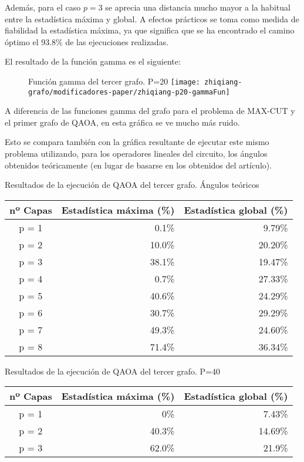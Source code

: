 Además, para el caso \(p = 3\) se aprecia una distancia mucho mayor a la habitual entre la estadística máxima y global. A efectos prácticos se toma como medida de fiabilidad la estadística máxima, ya que significa que se ha encontrado el camino óptimo el 93.8\% de las ejecuciones realizadas.

El resultado de la función gamma es el siguiente:
\begin{figure}[htbp]{}{Función gamma del tercer grafo. P=20}
  \centering
  \texttt{[image: zhiqiang-grafo/modificadores-paper/zhiqiang-p20-gammaFun]}
\end{figure}
A diferencia de las funciones gamma del grafo para el problema de MAX-CUT y el primer grafo de QAOA, en esta gráfica se ve mucho más ruido.

Esto se compara también con la gráfica resultante de ejecutar este mismo problema utilizando, para los operadores lineales del circuito, los ángulos obtenidos teóricamente (en lugar de basarse en los obtenidos del artículo).

\begin{table}[htbp]{}{Resultados de la ejecución de QAOA del tercer grafo. Ángulos teóricos}
  \centering
  \begin{tabular}{|c|r|r|}
    \hline
    \textbf{nº Capas} & \textbf{Estadística máxima (\%)} & \textbf{Estadística global (\%)} \\ \hline
    p = 1 &  0.1\% &  9.79\% \\ \hline
    p = 2 & 10.0\% & 20.20\% \\ \hline
    p = 3 & 38.1\% & 19.47\% \\ \hline
    p = 4 &  0.7\% & 27.33\% \\ \hline  %
    p = 5 & 40.6\% & 24.29\% \\ \hline
    p = 6 & 30.7\% & 29.29\% \\ \hline
    p = 7 & 49.3\% & 24.60\% \\ \hline
    p = 8 & 71.4\% & 36.34\% \\ \hline
  \end{tabular}
\end{table}

\begin{table}[htbp]{}{Resultados de la ejecución de QAOA del tercer grafo. P=40}
  \centering
  \begin{tabular}{|c|r|r|}
    \hline
    \textbf{nº Capas} & \textbf{Estadística máxima (\%)} & \textbf{Estadística global (\%)} \\ \hline
    p = 1 &    0\% &  7.43\% \\ \hline
    p = 2 & 40.3\% & 14.69\% \\ \hline
    p = 3 & 62.0\% &  21.9\% \\ \hline
  \end{tabular}
\end{table}

